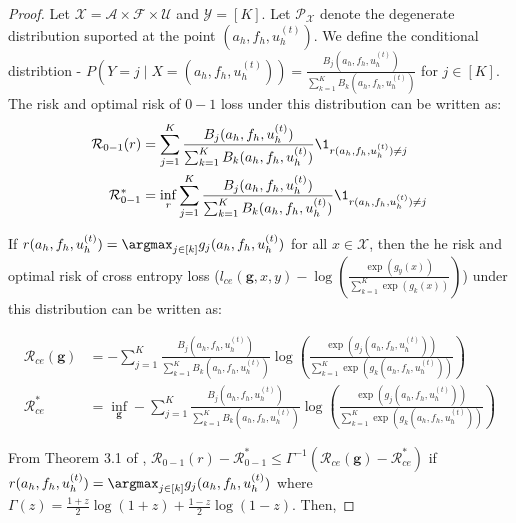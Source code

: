 \documentclass{article} %
\begin{document}
\begin{proof}
Let $\mathcal{X} = \mathcal{A} \times \mathcal{F} \times \mathcal{U}$ and $\mathcal{Y} = [K]$. Let $\mathcal{P}_{\mathcal{X}}$ denote the degenerate distribution suported at the point $(a_h, f_h, u_h^{(t)})$. We define the conditional distribtion - $P(Y = j \mid X = (a_h, f_h, u_h^{(t)})) = \frac{B_j(a_h, f_h, u^{(t)}_h)}{ \sum_{k = 1}^K B_k(a_h, f_h, u^{(t)}_h)}$ for $j \in [K]$. The risk and optimal risk of $0-1$ loss under this distribution can be written as:
\begin{align*}
    \mathcal{R}_{0-1}(r) &= \sum_{j = 1}^K \frac{B_j(a_h, f_h, u^{(t)}_h)}{\sum_{k = 1}^K B_k(a_h, f_h, u^{(t)}_h)}\1_{r(a_h, f_h, u^{(t)}_h) \neq j} \\
    \mathcal{R}_{0-1}^* &= \inf_r \sum_{j = 1}^K \frac{B_j(a_h, f_h, u^{(t)}_h)}{\sum_{k = 1}^K B_k(a_h, f_h, u^{(t)}_h)}\1_{r(a_h, f_h, u^{(t)}_h) \neq j} 
\end{align*}

If $r(a_h, f_h, u^{(t)}_h) = \argmax_{j \in [k]} g_j(a_h, f_h, u^{(t)}_h)$ for all $x \in \mathcal{X}$, then the he risk and optimal risk of cross entropy loss ($l_{ce}(\mathbf{g}, x, y)-\log\left(\frac{\exp\left(g_y(x)\right)}{\sum_{k = 1}^K\exp\left(g_k(x)\right)}\right)$) under this distribution can be written as:

\begin{align*}
    \mathcal{R}_{ce}(\mathbf{g}) &= -\sum_{j = 1}^K \frac{B_j(a_h, f_h, u^{(t)}_h)}{\sum_{k = 1}^K B_k(a_h, f_h, u^{(t)}_h)}\log\left(\frac{\exp\left(g_j(a_h, f_h, u^{(t)}_h)\right)}{\sum_{k = 1}^K\exp\left(g_k(a_h, f_h, u^{(t)}_h)\right)}\right) \\
    \mathcal{R}_{ce}^* &= \inf_{\mathbf{g}} -\sum_{j = 1}^K \frac{B_j(a_h, f_h, u^{(t)}_h)}{\sum_{k = 1}^K B_k(a_h, f_h, u^{(t)}_h)}\log\left(\frac{\exp\left(g_j(a_h, f_h, u^{(t)}_h)\right)}{\sum_{k = 1}^K\exp\left(g_k(a_h, f_h, u^{(t)}_h)\right)}\right) 
\end{align*}

From Theorem 3.1 of \citep{mao2023cross}, $\mathcal{R}_{0-1}(r) - \mathcal{R}_{0-1}^* \leq \Gamma^{-1}\left(\mathcal{R}_{ce}(\mathbf{g}) - \mathcal{R}_{ce}^*\right)$ if $r(a_h, f_h, u^{(t)}_h) = \argmax_{j \in [k]} g_j(a_h, f_h, u^{(t)}_h)$ where $\Gamma(z) = \frac{1 + z}{2}\log(1 + z) + \frac{1 - z}{2}\log(1 - z)$. Then,


\end{proof}
\end{document}
